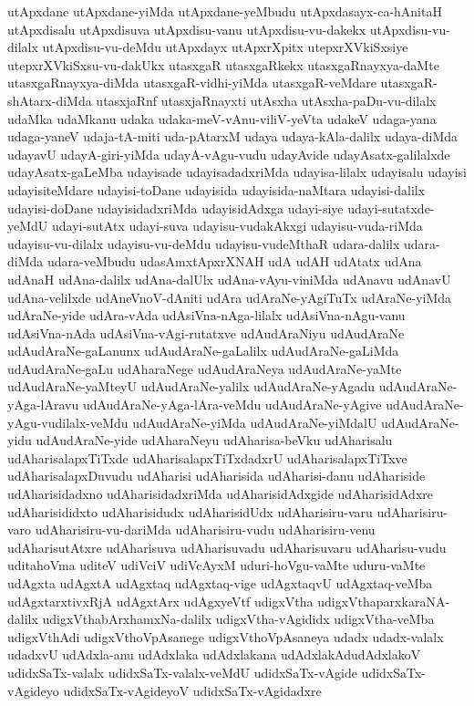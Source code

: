 {utApxdane
utApxdane-yiMda
utApxdane-yeMbudu
utApxdasayx-ca-hAnitaH
utApxdisalu
utApxdisuva
utApxdisu-vanu
utApxdisu-vu-dakekx
utApxdisu-vu-dilalx
utApxdisu-vu-deMdu
utApxdayx
utApxrXpitx
utepxrXVkiSxsiye
utepxrXVkiSxsu-vu-dakUkx
utasxgaR
utasxgaRkekx
utasxgaRnayxya-daMte
utasxgaRnayxya-diMda
utasxgaR-vidhi-yiMda
utasxgaR-veMdare
utasxgaR-shAtarx-diMda
utasxjaRnf
utasxjaRnayxti
utAsxha
utAsxha-paDu-vu-dilalx
udaMka
udaMkanu
udaka
udaka-meV-vAnu-viliV-yeVta
udakeV
udaga-yana
udaga-yaneV
udaja-tA-miti
uda-pAtarxM
udaya
udaya-kAla-dalilx
udaya-diMda
udayavU
udayA-giri-yiMda
udayA-vAgu-vudu
udayAvide
udayAsatx-galilalxde
udayAsatx-gaLeMba
udayisade
udayisadadxriMda
udayisa-lilalx
udayisalu
udayisi
udayisiteMdare
udayisi-toDane
udayisida
udayisida-naMtara
udayisi-dalilx
udayisi-doDane
udayisidadxriMda
udayisidAdxga
udayi-siye
udayi-sutatxde-yeMdU
udayi-sutAtx
udayi-suva
udayisu-vudakAkxgi
udayisu-vuda-riMda
udayisu-vu-dilalx
udayisu-vu-deMdu
udayisu-vudeMthaR
udara-dalilx
udara-diMda
udara-veMbudu
udasAmxtApxrXNAH
udA
udAH
udAtatx
udAna
udAnaH
udAna-dalilx
udAna-dalUlx
udAna-vAyu-viniMda
udAnavu
udAnavU
udAna-velilxde
udAneVnoV-dAniti
udAra
udAraNe-yAgiTuTx
udAraNe-yiMda
udAraNe-yide
udAra-vAda
udAsiVna-nAga-lilalx
udAsiVna-nAgu-vanu
udAsiVna-nAda
udAsiVna-vAgi-rutatxve
udAudAraNiyu
udAudAraNe
udAudAraNe-gaLanunx
udAudAraNe-gaLalilx
udAudAraNe-gaLiMda
udAudAraNe-gaLu
udAharaNege
udAudAraNeya
udAudAraNe-yaMte
udAudAraNe-yaMteyU
udAudAraNe-yalilx
udAudAraNe-yAgadu
udAudAraNe-yAga-lAravu
udAudAraNe-yAga-lAra-veMdu
udAudAraNe-yAgive
udAudAraNe-yAgu-vudilalx-veMdu
udAudAraNe-yiMda
udAudAraNe-yiMdalU
udAudAraNe-yidu
udAudAraNe-yide
udAharaNeyu
udAharisa-beVku
udAharisalu
udAharisalapxTiTxde
udAharisalapxTiTxdadxrU
udAharisalapxTiTxve
udAharisalapxDuvudu
udAharisi
udAharisida
udAharisi-danu
udAhariside
udAharisidadxno
udAharisidadxriMda
udAharisidAdxgide
udAharisidAdxre
udAharisididxto
udAharisidudx
udAharisidUdx
udAharisiru-varu
udAharisiru-varo
udAharisiru-vu-dariMda
udAharisiru-vudu
udAharisiru-venu
udAharisutAtxre
udAharisuva
udAharisuvadu
udAharisuvaru
udAharisu-vudu
uditahoVma
uditeV
udiVciV
udiVcAyxM
uduri-hoVgu-vaMte
uduru-vaMte
udAgxta
udAgxtA
udAgxtaq
udAgxtaq-vige
udAgxtaqvU
udAgxtaq-veMba
udAgxtarxtivxRjA
udAgxtArx
udAgxyeVtf
udigxVtha
udigxVthaparxkaraNA-dalilx
udigxVthabArxhamxNa-dalilx
udigxVtha-vAgididx
udigxVtha-veMba
udigxVthAdi
udigxVthoVpAsanege
udigxVthoVpAsaneya
udadx
udadx-valalx
udadxvU
udAdxla-anu
udAdxlaka
udAdxlakana
udAdxlakAdudAdxlakoV
udidxSaTx-valalx
udidxSaTx-valalx-veMdU
udidxSaTx-vAgide
udidxSaTx-vAgideyo
udidxSaTx-vAgideyoV
udidxSaTx-vAgidadxre
}
